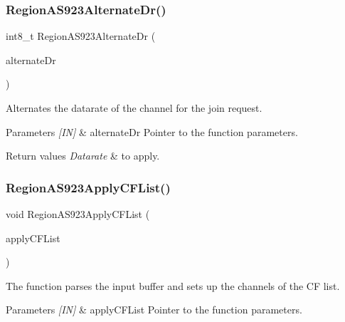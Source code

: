 \subsubsection{\texorpdfstring{Region\+A\+S923\+Alternate\+Dr()}{RegionAS923AlternateDr()}}
{\footnotesize\ttfamily int8\+\_\+t Region\+A\+S923\+Alternate\+Dr (\begin{DoxyParamCaption}\item[{\hyperlink{group__REGION_ga001ea4338d1c83f4c785b49d7ad2d696}{Alternate\+Dr\+Params\+\_\+t} $\ast$}]{alternate\+Dr }\end{DoxyParamCaption})}



Alternates the datarate of the channel for the join request. 


\begin{DoxyParams}{Parameters}
{\em \mbox{[}\+I\+N\mbox{]}} & alternate\+Dr Pointer to the function parameters.\\
\hline
\end{DoxyParams}

\begin{DoxyRetVals}{Return values}
{\em Datarate} & to apply. \\
\hline
\end{DoxyRetVals}
\mbox{\label{group__REGIONAS923_ga06106e86f717362c50165a5adaf73331}} 
\subsubsection{\texorpdfstring{Region\+A\+S923\+Apply\+C\+F\+List()}{RegionAS923ApplyCFList()}}
{\footnotesize\ttfamily void Region\+A\+S923\+Apply\+C\+F\+List (\begin{DoxyParamCaption}\item[{\hyperlink{group__REGION_ga71588e9ad07e34b78fa91d51881fd3c6}{Apply\+C\+F\+List\+Params\+\_\+t} $\ast$}]{apply\+C\+F\+List }\end{DoxyParamCaption})}



The function parses the input buffer and sets up the channels of the CF list. 


\begin{DoxyParams}{Parameters}
{\em \mbox{[}\+I\+N\mbox{]}} & apply\+C\+F\+List Pointer to the function parameters. \\
\hline
\end{DoxyParams}
\mbox{\label{group__REGIONAS923_gae3a2832d4cb1117e74dea4cdfe66998e}} 
